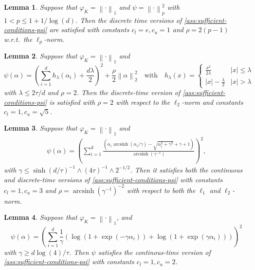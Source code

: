 \documentclass[a4paper]{article}
\newcommand{\pr}[1]{\left(#1\right)}
\newcommand{\abs}[1]{\left\lvert#1\right\rvert}
\newcommand{\norm}[1]{\left\|#1\right\|}
\DeclareMathOperator{\arcsinh}{arcsinh}
\theoremstyle{thmstyle}
\newtheorem{lemma}{Lemma}
\theoremstyle{defstyle}
\theoremstyle{remark}
\begin{document}
    \begin{lemma}
\label{lem:lp-for-l1}
    Suppose that $\varphi_K=\norm{\cdot}_1$ and $\psi=\norm{\cdot}_p^2$ with $1< p\leq 1+1/\log(d)$. Then the discrete time versions of \cref{ass:sufficient-conditions-psi} are satisfied with constants $c_l=e,c_u=1$ and $\rho=2(p-1)$ w.r.t.\ the $\ell_p$-norm.
\end{lemma}
\begin{lemma}
\label{lem:l1-moreau}
    Suppose that $\varphi_K=\norm{\cdot}_1$ and 
    \begin{equation*}
            \psi(\alpha) = \pr{\sum_{i=1}^d h_\lambda(\alpha_i)+\frac{d\lambda}{2}}^2+\frac{\rho}{2}\norm{\alpha}_2^2 \quad \text{with} \quad h_\lambda (x)= \begin{cases} \frac{x^2}{2\lambda} & \abs{x}\leq \lambda \\ \abs{x}-\frac{\lambda}{2} & \abs{x}> \lambda \end{cases}
    \end{equation*}
    with $\lambda \leq 2\tau /d $ and $\rho =2$.
    Then the discrete-time version of \cref{ass:sufficient-conditions-psi} is satisfied with $\rho=2$ with respect to the $\ell_2$-norm and constants $c_l=1, c_u = \sqrt{5}$.
\end{lemma}
\begin{lemma}
\label{lem:squared-hypentropy}
    Suppose that $\varphi_K=\norm{\cdot}_1$ and 
    \begin{align*}
        \psi(\alpha)= \pr{\sum_{i=1}^d \frac{\pr{ \alpha_i\arcsinh\pr{\alpha_i/\gamma}-\sqrt{\alpha_i^2+\gamma^2}+\gamma+1}}{\arcsinh\pr{\gamma^{-1}}}}^2,
    \end{align*} 
    with $\gamma\leq  \sinh(d/\tau)^{-1}\wedge (4\tau)^{-1}\wedge  2^{-1/2}$.
    Then it satisfies both the continuous and discrete-time versions of \cref{ass:sufficient-conditions-psi} with constants
    $c_l=1, c_u=3$ and $\rho = \arcsinh(\gamma^{-1})^{-2}$ with respect to both the $\ell_1$ and $\ell_2$-norm.
\end{lemma}
\begin{lemma}
\label{lem:sigmoidal-approximation}
Suppose that $\varphi_K=\norm{\cdot}_1$, and
\begin{equation*}
    \psi(\alpha)= \pr{\sum_{i=1}^d \frac{1}{\gamma}\pr{\log\pr{1+\exp\pr{-\gamma \alpha_i}}+\log\pr{1+\exp\pr{\gamma \alpha_i}}}}^2
\end{equation*}
with $\gamma \geq d\log (4)/\tau$.
Then $\psi$ satisfies the continous-time version of \cref{ass:sufficient-conditions-psi} with constants $c_l=1, c_u =2$.
\end{lemma}
\end{document}
